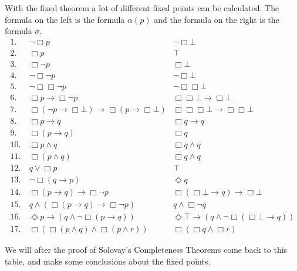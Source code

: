 \documentclass[../main.tex]{subfiles}
\begin{document}
With the fixed theorem a lot of different fixed points can be calculated. The
formula on the left is the formula $\alpha(p)$ and the formula on the right is
the formula $\sigma$.
\begin{align*}
	1. &\ \neg\Box p & \neg\Box\bot\\
	2. &\ \Box p & \top\\
	3. &\ \Box\neg p & \Box\bot\\
	4. &\ \neg\Box\neg p & \neg\Box\bot\\
	5. &\ \neg\Box\Box\neg p & \neg\Box\Box\bot\\
	6. &\ \Box p \rightarrow\Box\neg p & \Box\Box\bot\rightarrow\Box\bot\\
	7. &\ \Box (\neg
	p\rightarrow\Box\bot)\rightarrow\Box(p\rightarrow\Box\bot) &
	\Box\Box\Box\bot\rightarrow\Box\Box\bot\\
	8. &\ \Box p\rightarrow q & \Box q\rightarrow q\\
	9. &\ \Box(p\rightarrow q) & \Box q\\
	10. &\ \Box p\wedge q & \Box q\wedge q\\
	11. &\ \Box(p\wedge q) & \Box q\wedge q\\
	12. &\ q\vee \Box p & \top\\	
	13. &\ \neg\Box(q\rightarrow p) & \Diamond q\\
	14. &\ \Box(p\rightarrow q)\rightarrow\Box\neg p &
	\Box(\Box\bot\rightarrow q)\rightarrow\Box\bot\\
	15. &\ q\wedge(\Box(p\rightarrow q)\rightarrow\Box\neg p) &
	q\wedge\Box\neg q\\
	16. &\ \Diamond p\rightarrow(q\wedge\neg\Box(p\rightarrow q)) &
	\Diamond\top \rightarrow (q\wedge\neg\Box(\Box\bot\rightarrow q))\\
	17. &\ \Box(\Box(p\wedge q)\wedge\Box(p\wedge r)) & \Box(\Box q \wedge
	\Box r)
\end{align*}
\begingroup\vspace*{-\baselineskip}
\label{Fig}
\vspace*{\baselineskip}\endgroup

We will after the proof of Solovay's Completeness Theorems come back to this
table, and make some conclusions about the fixed points.
\end{document}
